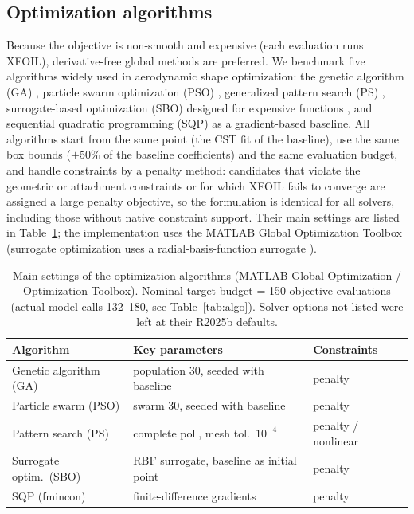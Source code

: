 \documentclass[preprint,3p,times]{elsarticle}
\begin{document}
\subsection{Optimization algorithms}
Because the objective is non-smooth and expensive (each evaluation runs XFOIL),
derivative-free global methods are preferred. We benchmark five algorithms
widely used in aerodynamic shape optimization: the genetic algorithm (GA)
\citep{Holland1992}, particle swarm optimization (PSO)
\citep{Kennedy1995}, generalized pattern search (PS) \citep{AudetDennis2002},
surrogate-based optimization (SBO) designed for expensive functions
\citep{Jones1998}, and sequential quadratic programming (SQP) as a
gradient-based baseline. All algorithms start from the same point (the CST fit
of the baseline), use the same box bounds ($\pm50\%$ of the baseline
coefficients) and the same evaluation budget, and handle constraints by a
penalty method: candidates that violate the geometric or attachment constraints
or for which XFOIL fails to converge are assigned a large penalty objective, so
the formulation is identical for all solvers, including those without native
constraint support. Their main settings are listed in
Table~\ref{tab:optparams}; the implementation uses the MATLAB Global
Optimization Toolbox (surrogate optimization uses a radial-basis-function
surrogate \citep{Gutmann2001}).

\begin{table}[!htbp]\centering
\caption{Main settings of the optimization algorithms (MATLAB Global
Optimization / Optimization Toolbox). Nominal target budget = 150 objective
evaluations (actual model calls 132--180, see Table~\ref{tab:algo}). Solver
options not listed were left at their R2025b defaults.}
\label{tab:optparams}
\begin{tabular}{@{}lll@{}}
\toprule
Algorithm & Key parameters & Constraints \\
\midrule
Genetic algorithm (GA)   & population 30, seeded with baseline       & penalty \\
Particle swarm (PSO)     & swarm 30, seeded with baseline            & penalty \\
Pattern search (PS)      & complete poll, mesh tol.\ $10^{-4}$       & penalty / nonlinear \\
Surrogate optim.\ (SBO)  & RBF surrogate, baseline as initial point  & penalty \\
SQP (fmincon)            & finite-difference gradients               & penalty \\
\bottomrule
\end{tabular}
\end{table}
\end{document}
